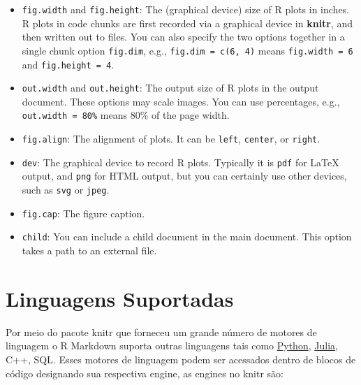 \documentclass[
]{book}
\newenvironment{Shaded}{\begin{snugshade}}{\end{snugshade}}
\newcommand{\KeywordTok}[1]{\textcolor[rgb]{0.13,0.29,0.53}{\textbf{#1}}}
\newcommand{\NormalTok}[1]{#1}
\newcommand{\OperatorTok}[1]{\textcolor[rgb]{0.81,0.36,0.00}{\textbf{#1}}}
\begin{document}
\begin{itemize}
\item
  \texttt{fig.width} and \texttt{fig.height}: The (graphical device) size of R plots in inches. R plots in code chunks are first recorded via a graphical device in \textbf{knitr}, and then written out to files. You can also specify the two options together in a single chunk option \texttt{fig.dim}, e.g., \texttt{fig.dim\ =\ c(6,\ 4)} means \texttt{fig.width\ =\ 6} and \texttt{fig.height\ =\ 4}.
\item
  \texttt{out.width} and \texttt{out.height}: The output size of R plots in the output document. These options may scale images. You can use percentages, e.g., \texttt{out.width\ =\ \textquotesingle{}80\%\textquotesingle{}} means 80\% of the page width.
\item
  \texttt{fig.align}: The alignment of plots. It can be \texttt{\textquotesingle{}left\textquotesingle{}}, \texttt{\textquotesingle{}center\textquotesingle{}}, or \texttt{\textquotesingle{}right\textquotesingle{}}.
\item
  \texttt{dev}: The graphical device to record R plots. Typically it is \texttt{\textquotesingle{}pdf\textquotesingle{}} for LaTeX output, and \texttt{\textquotesingle{}png\textquotesingle{}} for HTML output, but you can certainly use other devices, such as \texttt{\textquotesingle{}svg\textquotesingle{}} or \texttt{\textquotesingle{}jpeg\textquotesingle{}}.
\item
  \texttt{fig.cap}: The figure caption.
\item
  \texttt{child}: You can include a child document in the main document. This option takes a path to an external file.
\end{itemize}

\hypertarget{linguagens-suportadas}{%
\section{Linguagens Suportadas}\label{linguagens-suportadas}}

Por meio do pacote knitr que forneceu um grande número de motores de linguagem o R Markdown suporta outras linguagens tais como \href{https://www.python.org/}{Python}, \href{https://julialang.org/}{Julia}, C++, SQL. Esses motores de linguagem podem ser acessados dentro de blocos de código designando sua respectiva engine, as engines no knitr são:

\begin{Shaded}
\end{Shaded}
\end{document}
